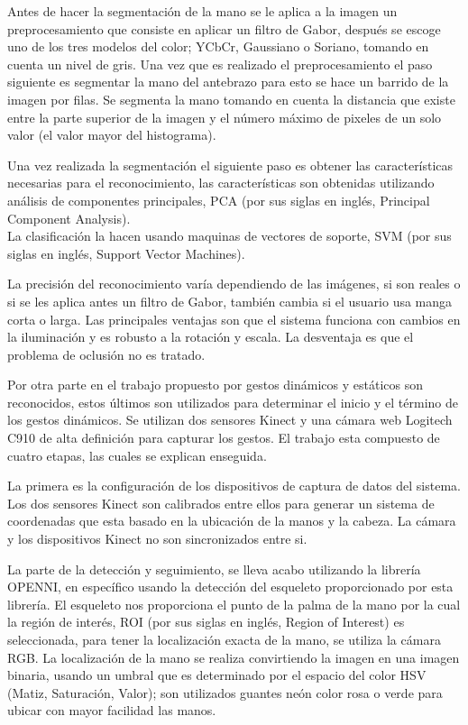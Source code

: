 Antes de hacer la segmentación de la mano se le aplica a la imagen un preprocesamiento que consiste en aplicar un filtro de Gabor, después se escoge uno de los tres modelos del color; YCbCr, Gaussiano o Soriano, tomando en cuenta un nivel de gris.  
Una vez que es realizado el preprocesamiento el paso siguiente es segmentar la mano del antebrazo para esto se hace un barrido de la imagen por filas. Se segmenta la mano tomando en cuenta la distancia que existe entre la parte superior de la imagen y el número máximo de pixeles de un solo valor (el valor mayor del histograma).

Una vez realizada la segmentación el siguiente paso es obtener las características necesarias para el reconocimiento, las características son obtenidas utilizando análisis de componentes principales, PCA (por sus siglas en inglés, Principal Component Analysis).\\
La clasificación la hacen usando maquinas de vectores de soporte, SVM (por sus siglas en inglés, Support Vector Machines).   

La precisión del reconocimiento varía dependiendo de las imágenes, si son reales o si se les aplica antes un filtro de Gabor, también cambia si el usuario usa manga corta o larga.  
Las principales ventajas son que el sistema funciona con cambios en la iluminación y es robusto a la rotación y escala. La desventaja es que el problema de oclusi\'on no es tratado. 


Por otra parte en el trabajo propuesto por \citep{Caputo2012} gestos dinámicos y estáticos son reconocidos, estos últimos son utilizados para determinar el inicio y el término de los gestos dinámicos. Se utilizan dos sensores Kinect y una cámara web Logitech C910 de alta definición para capturar los gestos. El trabajo esta compuesto de cuatro etapas, las cuales se explican enseguida. 

La primera es la configuración de los dispositivos de captura de datos del sistema. Los dos sensores Kinect son calibrados entre ellos para generar un sistema de coordenadas que esta basado en la ubicación de la  manos y la cabeza. La cámara y los dispositivos Kinect no son sincronizados entre si.  

La parte de la detección y seguimiento, se lleva acabo utilizando la librería OPENNI, en específico usando la detección del esqueleto proporcionado por esta librería. El esqueleto nos proporciona el punto de la palma de la mano por la cual la región de interés, ROI (por sus siglas en inglés, Region of Interest) es seleccionada, para tener la localización exacta de la mano, se utiliza la cámara RGB. La localización de la mano se realiza convirtiendo la imagen en una imagen binaria, usando un umbral que es determinado por el espacio del color HSV (Matiz, Saturación, Valor); son utilizados guantes neón color rosa o verde para ubicar con mayor facilidad las manos.   


